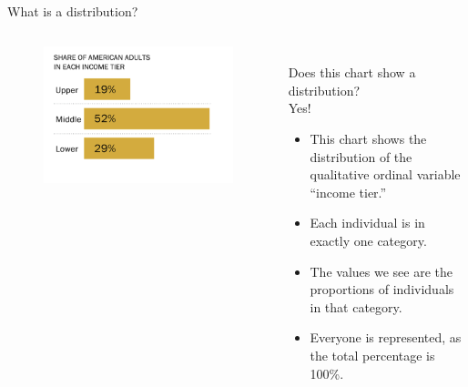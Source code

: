 \documentclass[aspectratio=169]{../latex_main/tntbeamer}  %
\begin{document}
	
	
	\begin{frame}{What is a distribution?}
	\vspace{-1em}
	    \begin{columns}
	    
	        \begin{column}{.4\textwidth}
	              \begin{figure}
	                  \includegraphics[scale=.5]{Bild20}
	               \end{figure} 
	        \end{column}
	        
	        \begin{column}{.5\textwidth}
	           
	              \\Does this chart show a distribution?\\
	              \bigskip
	              Yes!
	              \begin{itemize}
	                  \item This chart shows the distribution of the qualitative ordinal variable “income tier.”
	                  \item Each individual is in exactly one category.
	                  \item The values we see are the proportions of individuals in that category.
	                  \item Everyone is represented, as the total percentage is 100\%.
	              \end{itemize}
	        \end{column}
	        
	    \end{columns}
	\end{frame}
\end{document}
